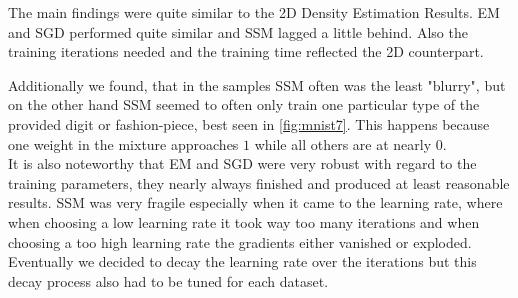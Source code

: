 The main findings were quite similar to the 2D Density Estimation Results. EM and SGD performed quite similar and SSM lagged a little behind. 
Also the training iterations needed and the training time reflected the 2D counterpart. 

Additionally we found, that in the samples SSM often was the least "blurry", but on the other hand SSM seemed to often only train 
one particular type of the provided digit or fashion-piece, best seen in \ref{fig:mnist7}. This happens because one weight in the mixture approaches $1$ while 
all others are at nearly $0$. \\
It is also noteworthy that EM and SGD were very robust with regard to the training parameters, they nearly always finished and produced at least reasonable results. 
SSM was very fragile especially when it came to the learning rate, where when choosing a low learning rate it took way too many iterations 
and when choosing a too high learning rate the gradients either vanished or exploded. Eventually we decided to decay the learning rate over 
the iterations but this decay process also had to be tuned for each dataset. 